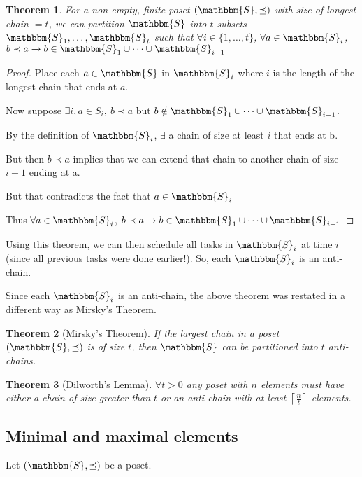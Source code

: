 \documentclass[14pt]{extarticle}
\newcommand{\impl}{\xrightarrow{}}
\newcommand{\Sset}{\mathbbm{S}}
\newcommand{\pordereq}{\preceq}
\newcommand{\porder}{\prec}
\newtheorem{theorem}{Theorem}
\begin{document}
\begin{theorem}
    For a non-empty, finite poset $(\Sset, \pordereq)$ with size of longest chain $= t$, we can partition $\Sset$ into $t$ subsets $\Sset_1, \dots, \Sset_t$ such that $\forall i \in \{1, \dots, t\}$, $\forall a \in \Sset_i$, $b \porder a \impl b \in \Sset_1 \cup \dots \cup \Sset_{i-1}$
\end{theorem}

\begin{proof}
    Place each $a \in \Sset$ in $\Sset_i$ where $i$ is the length of the longest chain that ends at $a$.

    Now suppose $\exists i, a \in S_i, \ b \porder a$ but $b \notin \Sset_1 \cup \dots \cup \Sset_{i-1}$.

    By the definition of $\Sset_i$, $\exists$ a chain of size at least $i$ that ends at b.

    But then $b \porder a$ implies that we can extend that chain to another chain of size $i+1$ ending at a.

    But that contradicts the fact that $a \in \Sset_i$

    Thus $\forall a \in \Sset_i$, $b \porder a \impl b \in \Sset_1 \cup \dots \cup \Sset_{i-1}$
\end{proof}

Using this theorem, we can then schedule all tasks in $\Sset_i$ at time $i$ (since all previous tasks were done earlier!). So, each $\Sset_i$ is an anti-chain.

Since each $\Sset_i$ is an anti-chain, the above theorem was restated in a different way as Mirsky's Theorem.

\begin{theorem}[Mirsky's Theorem]
    If the largest chain in a poset $(\Sset, \pordereq)$ is of size $t$, then $\Sset$ can be partitioned into $t$ anti-chains.
\end{theorem}

\begin{theorem}[Dilworth's Lemma]
    $\forall t > 0$ any poset with $n$ elements must have either a chain of size greater than $t$ or an anti chain with at least $\left \lceil \frac{n}{t} \right \rceil$ elements.
\end{theorem}

\subsection{Minimal and maximal elements}

Let $(\Sset, \pordereq)$ be a poset. 
\end{document}
